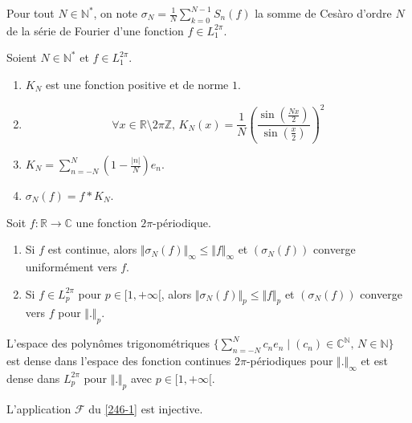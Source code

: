 	\begin{notation}
		Pour tout $N \in \mathbb{N}^*$, on note $\sigma_N = \frac{1}{N} \sum_{k=0}^{N-1} S_n(f)$ la somme de Cesàro d'ordre $N$ de la série de Fourier d'une fonction $f \in L_1^{2 \pi}$.
	\end{notation}

	\begin{proposition}
		Soient $N \in \mathbb{N}^*$ et $f \in L_1^{2 \pi}$.
		\begin{enumerate}[label=(\roman*)]
			\item $K_N$ est une fonction positive et de norme $1$.
			\item \[ \forall x \in \mathbb{R} \setminus 2 \pi \mathbb{Z}, \, K_N(x) = \frac{1}{N} \left(\frac{\sin \left( \frac{Nx}{2} \right)}{\sin \left( \frac{x}{2} \right)}\right)^2 \]
			\item $K_N = \sum_{n=-N}^{N} \left(1 - \frac{\vert n \vert}{N}\right) e_n$.
			\item $\sigma_N(f) = f * K_N$.
		\end{enumerate}
	\end{proposition}


	\begin{theorem}[Fejér]
		Soit $f : \mathbb{R} \rightarrow \mathbb{C}$ une fonction $2\pi$-périodique.
		\begin{enumerate}[label=(\roman*)]
			\item Si $f$ est continue, alors $\Vert \sigma_N(f) \Vert_\infty \leq \Vert f \Vert_\infty$ et $(\sigma_N(f))$ converge uniformément vers $f$.
			\item Si $f \in L_p^{2\pi}$ pour $p \in [1,+\infty[$, alors $\Vert \sigma_N(f) \Vert_p \leq \Vert f \Vert_p$ et $(\sigma_N(f))$ converge vers $f$ pour $\Vert . \Vert_p$.
		\end{enumerate}
	\end{theorem}

	\begin{corollary}
		L'espace des polynômes trigonométriques $\{ \sum_{n=-N}^N c_n e_n \mid (c_n) \in \mathbb{C}^{\mathbb{N}}, \, N \in \mathbb{N} \}$ est dense dans l'espace des fonction continues $2\pi$-périodiques pour $\Vert . \Vert_\infty$ et est dense dans $L_p^{2\pi}$ pour $\Vert . \Vert_p$ avec $p \in [1,+\infty[$.
	\end{corollary}


	\begin{application}
		L'application $\mathcal{F}$ du \cref{246-1} est injective.
	\end{application}

